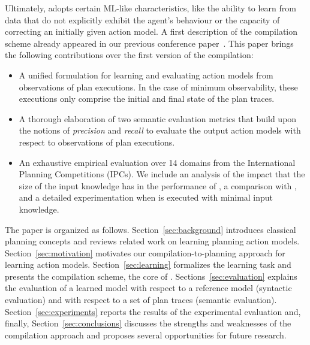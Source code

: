 Ultimately, \FAMA adopts certain ML-like characteristics, like the ability to learn from data that do not explicitly exhibit the agent's behaviour or the capacity of correcting an initially given action model. A first description of the \FAMA compilation scheme already appeared in our previous conference paper~\cite{aineto2018learning}. This paper brings the following contributions over the first version of the compilation:

\begin{itemize}
\item A unified formulation for learning and evaluating action models from observations of plan executions. In the case of minimum observability, these executions only comprise the initial and final state of the plan traces.
\item A thorough elaboration of two semantic evaluation metrics that build upon the notions of {\em precision} and {\em recall} to evaluate the output action models with respect to observations of plan executions.
\item An exhaustive empirical evaluation over 14 domains from the International Planning Competitions (IPCs). We include an analysis of the impact that the size of the input knowledge has in the performance of \FAMA, a comparison with \ARMS, and a detailed experimentation when \FAMA is executed with minimal input knowledge.
\end{itemize}


The paper is organized as follows. Section~\ref{sec:background} introduces classical planning concepts and reviews related work on learning planning action models. Section~\ref{sec:motivation} motivates our compilation-to-planning approach for learning action models. Section~\ref{sec:learning} formalizes the learning task and presents the compilation scheme, the core of \FAMA. Sections~\ref{sec:evaluation} explains the evaluation of a learned model with respect to a reference model (syntactic evaluation) and with respect to a set of plan traces (semantic evaluation). Section~\ref{sec:experiments} reports the results of the experimental evaluation and, finally, Section~\ref{sec:conclusions} discusses the strengths and weaknesses of the compilation approach and proposes several opportunities for future research.








